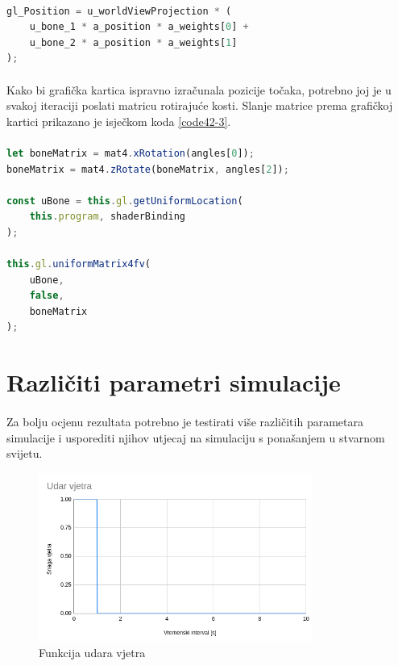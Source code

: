 \documentclass[times, utf8, diplomski]{fer}
\begin{document}
\paragraph{}
\begin{lstlisting}[language=Javascript,label=code42-2,caption=Prošireno računanje pozicije točke na dvije kosti]
gl_Position = u_worldViewProjection * (
	u_bone_1 * a_position * a_weights[0] +
	u_bone_2 * a_position * a_weights[1]
);
\end{lstlisting}

\paragraph{}
Kako bi grafička kartica ispravno izračunala pozicije točaka, potrebno joj je u svakoj 
iteraciji poslati matricu rotirajuće kosti. Slanje matrice prema grafičkoj kartici prikazano je isječkom koda \ref{code42-3}.

\paragraph{}
\begin{lstlisting}[language=Javascript,label=code42-3,caption=Slanje dodatnih informacija prema grafičkoj kartici]
let boneMatrix = mat4.xRotation(angles[0]);
boneMatrix = mat4.zRotate(boneMatrix, angles[2]);

const uBone = this.gl.getUniformLocation(
	this.program, shaderBinding
);

this.gl.uniformMatrix4fv(
	uBone,
	false,
	boneMatrix
);
\end{lstlisting}
\paragraph{}

\section{Različiti parametri simulacije}
\paragraph{}
Za bolju ocjenu rezultata potrebno je testirati više različitih parametara simulacije i 
usporediti njihov utjecaj na simulaciju s ponašanjem u stvarnom svijetu.

\begin{figure}[h]
	\centering
	\includegraphics[width=0.8\textwidth]{img/43-0}
	\caption{Funkcija udara vjetra}
	\label{fig:43-0}
\end{figure}
\end{document}
